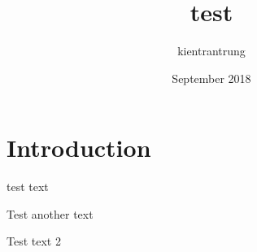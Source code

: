 \documentclass{article}
\title{test}
\author{kientrantrung }
\date{September 2018}
\begin{document}
\maketitle

\section{Introduction}
test text

Test another text

Test text 2
\end{document}
